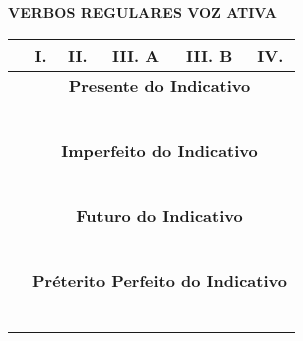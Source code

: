 \documentclass[12pt, oneside, a4paper, article]{article}
\begin{document}
\begin{table}[!hb]
\centering
\textbf{VERBOS REGULARES VOZ ATIVA} 
\vspace{1 ex}

\begin{tabular}{|l|p{2.5cm}|p{2.5cm}|p{2.5cm}|p{2.5cm}|p{2.5cm}|} 
\hline \hline
& \multicolumn{1}{c|}{I.} & \multicolumn{1}{c|}{II.} & \multicolumn{1}{c|}{III. A} & \multicolumn{1}{c|}{III. B} & \multicolumn{1}{c|}{IV.}  \\
\hline
& \multicolumn{5}{c|}{\textbf{Presente do Indicativo}} \\
\hline
 &  &  &  &  &    \\ \hline
 &  &  &  &  &    \\ \hline
 &  &  &  &  &    \\ \hline
 &  &  &  &  &    \\ \hline
 &  &  &  &  &    \\ \hline
 &  &  &  &  &   \\ 
\hline \hline

& \multicolumn{5}{c|}{\textbf{Imperfeito do Indicativo}} \\
\hline
 &  &  &  &  &   \\ \hline
 &  &  &  &  &   \\ \hline
 &  &  &  &  &   \\ \hline
 &  &  &  &  &   \\ \hline
 &  &  &  &  &   \\ \hline
 &  &  &  &  &   \\ 
\hline \hline

& \multicolumn{5}{c|}{\textbf{Futuro do Indicativo}} \\
\hline
 &  &  &  &  &   \\ \hline
 &  &  &  &  &   \\ \hline
 &  &  &  &  &   \\ \hline
 &  &  &  &  &   \\ \hline
 &  &  &  &  &   \\ \hline
 &  &  &  &  &   \\ 
\hline \hline

& \multicolumn{5}{c|}{\textbf{Préterito Perfeito do Indicativo}} \\
\hline
 &  &  &  &  &   \\ \hline
 &  &  &  &  &   \\ \hline
 &  &  &  &  &   \\ \hline
 &  &  &  &  &   \\ \hline
 &  &  &  &  &   \\ \hline
 &  &  &  &  &   \\ 
\hline \hline


\end{tabular}
\end{table}
\end{document}
